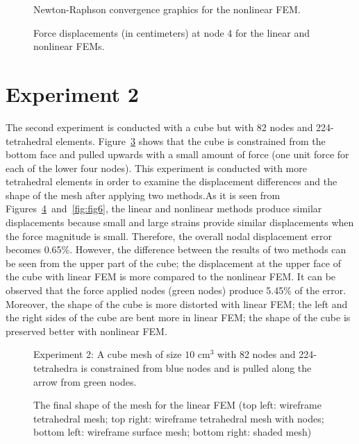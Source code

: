 \clearpage
\begin{figure}
\centerline{}
\caption{Newton-Raphson convergence graphics for the nonlinear FEM.}
\label{fig:conv}
\end{figure}


\begin{figure}[h]
\centerline{}
\caption{Force displacements (in centimeters) at node 4 for the linear and nonlinear FEMs.}
\label{fig:epsFEM}
\end{figure}

\clearpage
\section{Experiment 2}
\label{ii}

The second experiment is conducted with a cube but with 82 nodes and 224-tetrahedral elements. Figure~\ref{fig:fig4} shows that the cube is constrained from the bottom face and pulled upwards with a small amount of force (one unit force for each of the lower four nodes). This experiment is conducted with more tetrahedral elements in order to examine the displacement differences and the shape of the mesh after applying two methods.As it is seen from Figures~\ref{fig:fig5}~and~\ref{fig:fig6}, the linear and nonlinear methods produce similar displacements because small and large strains provide similar displacements when the force magnitude is small. Therefore, the overall nodal displacement error becomes 0.65\%. However, the difference between the results of two methods can be seen from the upper part of the cube; the displacement at the upper face of the cube with linear FEM is more compared to the nonlinear FEM. It can be observed that the force applied nodes (green nodes) produce 5.45\% of the error. Moreover, the shape of the cube is more distorted with linear FEM; the left and the right sides of the cube are bent more in linear FEM; the shape of the cube is preserved better with nonlinear FEM.

\begin{figure}[h]
\centerline{}
\caption{Experiment 2: A cube mesh of size $10$ cm$^{3}$ with 82 nodes and 224-tetrahedra  is constrained from blue nodes and is pulled along the arrow from green nodes.}
\label{fig:fig4}
\end{figure}

\begin{figure}[h]
\centerline{}
\caption{The final shape of the mesh for the linear FEM (top left: wireframe tetrahedral mesh; top right: wireframe tetrahedral mesh with nodes; bottom left: wireframe surface mesh; bottom right: shaded mesh)}
\label{fig:fig5}
\end{figure}

